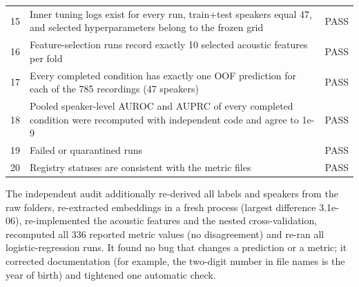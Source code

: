 \documentclass[11pt,a4paper]{article}
\begin{document}
\begin{center}
\begin{longtable}{>{\raggedleft\arraybackslash}p{1.55cm}>{\raggedright\arraybackslash}p{12.14cm}>{\raggedright\arraybackslash}p{1.55cm}}
\hspace{0pt}15 & \hspace{0pt}Inner tuning logs exist for every run, train+\allowbreak{}test speakers equal 47, and selected hyperparameters belong to the frozen grid & \hspace{0pt}PASS\\
\hspace{0pt}16 & \hspace{0pt}Feature-selection runs record exactly 10 selected acoustic features per fold & \hspace{0pt}PASS\\
\hspace{0pt}17 & \hspace{0pt}Every completed condition has exactly one OOF prediction for each of the 785 recordings (47 speakers) & \hspace{0pt}PASS\\
\hspace{0pt}18 & \hspace{0pt}Pooled speaker-level AUROC and AUPRC of every completed condition were recomputed with independent code and agree to 1e-9 & \hspace{0pt}PASS\\
\hspace{0pt}19 & \hspace{0pt}Failed or quarantined runs & \hspace{0pt}PASS\\
\hspace{0pt}20 & \hspace{0pt}Registry statuses are consistent with the metric files & \hspace{0pt}PASS\\
\end{longtable}\end{center}
The independent audit additionally re-derived all labels and speakers from the raw folders, re-extracted embeddings in a fresh process (largest difference 3.1e-06), re-implemented the acoustic features and the nested cross-validation, recomputed all 336 reported metric values (no disagreement) and re-ran all logistic-regression runs. It found no bug that changes a prediction or a metric; it corrected documentation (for example, the two-digit number in file names is the year of birth) and tightened one automatic check.
\end{document}
